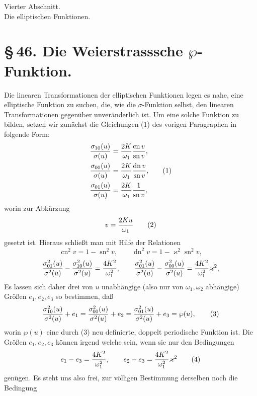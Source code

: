 \documentclass[11pt]{article}
\providecommand{\sn}{\operatorname{sn}}
\providecommand{\cn}{\operatorname{cn}}
\providecommand{\dn}{\operatorname{dn}}
\begin{document}
\begin{center}
{\large Vierter Abschnitt.}\\[0.7em]
{\Large Die elliptischen Funktionen.}
\end{center}

\section*{\S\,46. Die Weierstrasssche $\wp$-Funktion.}

Die linearen Transformationen der elliptischen Funktionen legen es nahe, eine elliptische Funktion zu suchen, die, wie die $\sigma$-Funktion selbst, den linearen Transformationen gegenüber unveränderlich ist. Um eine solche Funktion zu bilden, setzen wir zunächst die Gleichungen (1) des vorigen Paragraphen in folgende Form:
\begin{equation}
\begin{aligned}
{\sigma_{10}(u)\over\sigma(u)}&={2K\over\omega_1}{\cn v\over\sn v},\\
{\sigma_{00}(u)\over\sigma(u)}&={2K\over\omega_1}{\dn v\over\sn v},\\
{\sigma_{01}(u)\over\sigma(u)}&={2K\over\omega_1}{1\over\sn v},
\end{aligned}
\tag{1}
\end{equation}
worin zur Abkürzung
\begin{equation}
v={2Ku\over\omega_1}
\tag{2}
\end{equation}
gesetzt ist. Hieraus schließt man mit Hilfe der Relationen
\[
\cn^2v=1-\sn^2v,
\qquad
\dn^2v=1-\varkappa^2\sn^2v,
\]
\[
{\sigma_{01}^2(u)\over\sigma^2(u)}-{\sigma_{10}^2(u)\over\sigma^2(u)}={4K^2\over\omega_1^2},
\qquad
{\sigma_{01}^2(u)\over\sigma^2(u)}-{\sigma_{00}^2(u)\over\sigma^2(u)}={4K^2\over\omega_1^2}\varkappa^2,
\]
Es lassen sich daher drei von $u$ unabhängige (also nur von $\omega_1,\omega_2$ abhängige) Größen $e_1,e_2,e_3$ so bestimmen, daß
\begin{equation}
{\sigma_{10}^2(u)\over\sigma^2(u)}+e_1
={\sigma_{00}^2(u)\over\sigma^2(u)}+e_2
={\sigma_{01}^2(u)\over\sigma^2(u)}+e_3
=\wp(u),
\tag{3}
\end{equation}
worin $\wp(u)$ eine durch (3) neu definierte, doppelt periodische Funktion ist. Die Größen $e_1,e_2,e_3$ können irgend welche sein, wenn sie nur den Bedingungen
\begin{equation}
e_1-e_3={4K^2\over\omega_1^2},
\qquad
e_2-e_3={4K^2\over\omega_1^2}\varkappa^2
\tag{4}
\end{equation}
genügen. Es steht uns also frei, zur völligen Bestimmung derselben noch die Bedingung
\end{document}
